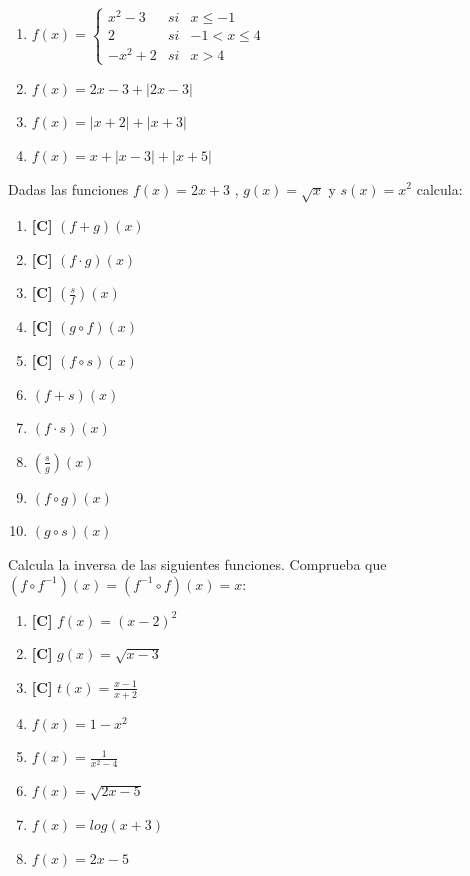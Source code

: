 \begin{enumerate}[topsep=0pt]
	\item $f(x) = 
		\left\{
		\begin{array}{lcc}
			x^2 - 3  &  si  & x \le -1 \\
			2        &  si  & -1 < x \le 4 \\
			-x^2 + 2 &  si  & x > 4
		\end{array}
		\right.$
	
	\item $f(x) = 2x - 3 + |2x-3|$
	\item $f(x) = |x+2| + |x+3|$
	\item $f(x) = x +|x-3| + |x+5|$

\end{enumerate}


\Exercicio Dadas las funciones $f(x) = 2x + 3$ , $g(x) = \sqrt{x}$ y $s(x) = x^2$ calcula:

\begin{enumerate}[topsep=0pt]
\item \textbf{[C]} $ (f+g)(x) $
	\item \textbf{[C]} $ (f \cdot g)(x) $
	\item \textbf{[C]} $ (\frac{s}{f})(x)$
	\item \textbf{[C]} $ (g \circ f)(x)$
	\item \textbf{[C]} $ (f \circ s)(x)$
	
	\item  $ (f + s)(x)$
	\item  $ (f \cdot s)(x)$
	\item  $ (\frac{s}{g})(x)$
	\item  $ (f \circ g)(x)$
	\item  $ (g \circ s)(x)$
\end{enumerate}


\Exercicio Calcula la inversa de las siguientes funciones. Comprueba que $(f \circ f^{-1})(x) = (f^{-1} \circ f)(x) = x$:

\begin{enumerate}[topsep=0pt]
	\item \textbf{[C]} $f(x) = (x-2)^2$
	\item \textbf{[C]} $g(x) = \sqrt{x-3} $
	\item \textbf{[C]} $t(x) = \frac{x-1}{x+2}$
	
	\item $f(x) = 1-x^2$
	\item $f(x) = \frac{1}{x^2-4}$
	\item $f(x) = \sqrt{2x-5}$
	\item $f(x) = log(x + 3)$
	\item $f(x) = 2x - 5$
\end{enumerate}